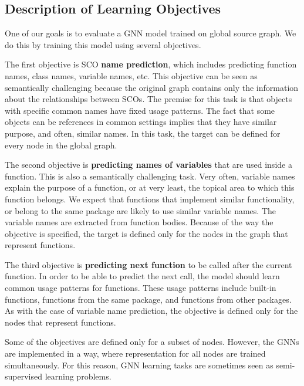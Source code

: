 \documentclass[a4paper,twoside]{article}
\begin{document}
\subsection{Description of Learning Objectives}

One of our goals is to evaluate a GNN model trained on global source graph. We do this by training this model using several objectives.

The first objective is SCO \textbf{name prediction}, which includes predicting function names, class names, variable names, etc. This objective can be seen as semantically challenging because the original graph contains only the information about the relationships between SCOs. The premise for this task is that objects with specific common names have fixed usage patterns. The fact that some objects can be references in common settings implies that they have similar purpose, and often, similar names. In this task, the target can be defined for every node in the global graph.

The second objective is \textbf{predicting names of variables} that are used inside a function. This is also a semantically challenging task. Very often, variable names explain the purpose of a function, or at very least, the topical area to which this function belongs. We expect that functions that implement similar functionality, or belong to the same package are likely to use similar variable names. The variable names are extracted from function bodies. Because of the way the objective is specified, the target is defined only for the nodes in the graph that represent functions.  

The third objective is \textbf{predicting next function} to be called after the current function. In order to be able to predict the next call, the model should learn common usage patterns for functions. These usage patterns include built-in functions, functions from the same package, and functions from other packages. As with the case of variable name prediction, the objective is defined only for the nodes that represent functions. 

Some of the objectives are defined only for a subset of nodes. However, the GNNs are implemented in a way, where representation for all nodes are trained simultaneously. For this reason, GNN learning tasks are sometimes seen as semi-supervised learning problems.
\end{document}
